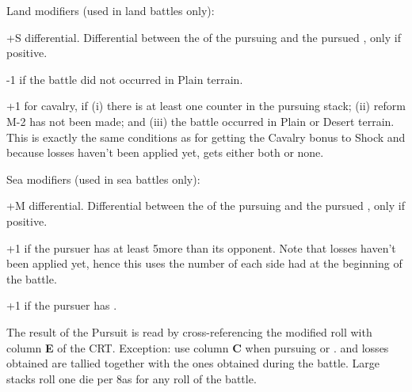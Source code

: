 Land modifiers (used in land battles only):
\begin{modlist}
\item[+S] \Shock differential. Differential between the \Shock of the pursuing
  \LeaderG and the pursued \LeaderG, only if positive.
\item[-1] if the battle did not occurred in Plain terrain.
\item[+1] for \TUR {} cavalry, if (i) there is at least one \TUR
  \ARMY counter in the pursuing stack; (ii) reform M-2 has not been made; and
  (iii) the battle occurred in Plain or Desert terrain. This is exactly the
  same conditions as for getting the Cavalry bonus to Shock and because losses
  haven't been applied yet, \TUR gets either both or none.
\end{modlist}

Sea modifiers (used in sea battles only):
\begin{modlist}
\item[+M] \Man differential. Differential between the \Man of the pursuing
  \LeaderA and the pursued \LeaderA, only if positive.
\item[+1] if the pursuer has at least 5\ND more than its opponent. Note that
  losses haven't been applied yet, hence this uses the number of \ND each side
  had at the beginning of the battle.
\item[+1] if the pursuer has .
\end{modlist}

The result of the Pursuit is read by cross-referencing the modified roll with
column \textbf{E} of the CRT. Exception: use column \textbf{C} when pursuing
\NTD or \NGD. \textetoile and losses obtained are tallied together with the
ones obtained during the battle. Large \ROTW stacks roll one die per 8\LD as
for any roll of the battle.

